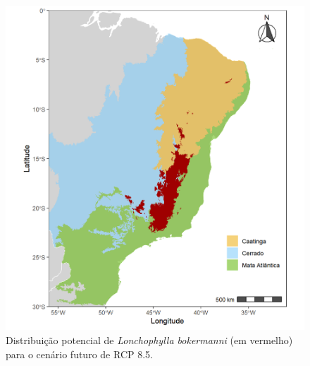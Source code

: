 \documentclass[
  11pt,
]{article}
\begin{document}
\begin{figure}
\centering
\includegraphics[width=1\textwidth,height=\textheight]{../Graficos/L_bokermanni_mapas_feitos/RCP85.jpeg}
\caption{Distribuição potencial de \emph{Lonchophylla bokermanni} (em
vermelho) para o cenário futuro de RCP 8.5.}
\end{figure}
\end{document}
